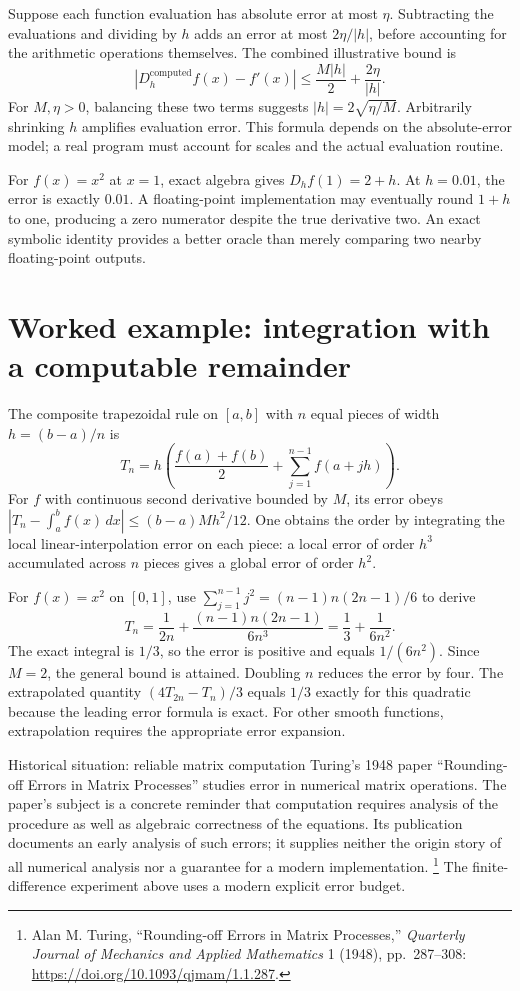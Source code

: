 Suppose each function evaluation has absolute error at most $\eta$.
Subtracting the evaluations and dividing by $h$ adds an error at most
$2\eta/|h|$, before accounting for the arithmetic operations themselves.
The combined illustrative bound is
\[
 |D_h^{\mathrm{computed}}f(x)-f'(x)|
 \leq \frac{M|h|}{2}+\frac{2\eta}{|h|}.
\]
For $M,\eta>0$, balancing these two terms suggests
$|h|=2\sqrt{\eta/M}$. Arbitrarily shrinking $h$ amplifies evaluation
error. This formula depends on the absolute-error model; a real program
must account for scales and the actual evaluation routine.

For $f(x)=x^2$ at $x=1$, exact algebra gives $D_hf(1)=2+h$.
At $h=0.01$, the error is exactly $0.01$. A floating-point implementation
may eventually round $1+h$ to one, producing a zero numerator despite the
true derivative two. An exact symbolic identity provides a better oracle
than merely comparing two nearby floating-point outputs.

\section{Worked example: integration with a computable remainder}
The composite trapezoidal rule on $[a,b]$ with $n$ equal pieces of width
$h=(b-a)/n$ is
\[
 T_n=h\left(\frac{f(a)+f(b)}2+\sum_{j=1}^{n-1}f(a+jh)\right).
\]
For $f$ with continuous second derivative bounded by $M$, its error obeys
$|T_n-\int_a^bf(x)\,dx|\leq(b-a)Mh^2/12$.
One obtains the order by integrating the local linear-interpolation error
on each piece: a local error of order $h^3$ accumulated across $n$ pieces
gives a global error of order $h^2$.

For $f(x)=x^2$ on $[0,1]$, use
$\sum_{j=1}^{n-1}j^2=(n-1)n(2n-1)/6$ to derive
\[
 T_n=\frac1{2n}+\frac{(n-1)n(2n-1)}{6n^3}
 =\frac13+\frac1{6n^2}.
\]
The exact integral is $1/3$, so the error is positive and equals
$1/(6n^2)$. Since $M=2$, the general bound is attained. Doubling $n$
reduces the error by four. The extrapolated quantity
$(4T_{2n}-T_n)/3$ equals $1/3$ exactly for this quadratic because the
leading error formula is exact. For other smooth functions, extrapolation
requires the appropriate error expansion.

\begin{learningcard}[breakable=false]{Historical situation: reliable matrix computation}
Turing's 1948 paper ``Rounding-off Errors in Matrix Processes'' studies
error in numerical matrix operations. The paper's subject is a concrete
reminder that computation requires analysis of the procedure as well as
algebraic correctness of the equations. Its publication documents an early
analysis of such errors; it supplies neither the origin story of all
numerical analysis nor a guarantee for a modern implementation.
\footnote{Alan M. Turing, ``Rounding-off Errors in Matrix Processes,''
\emph{Quarterly Journal of Mechanics and Applied Mathematics} 1 (1948),
pp.~287--308: \url{https://doi.org/10.1093/qjmam/1.1.287}.}
The finite-difference experiment above uses a modern explicit error budget.
\end{learningcard}

